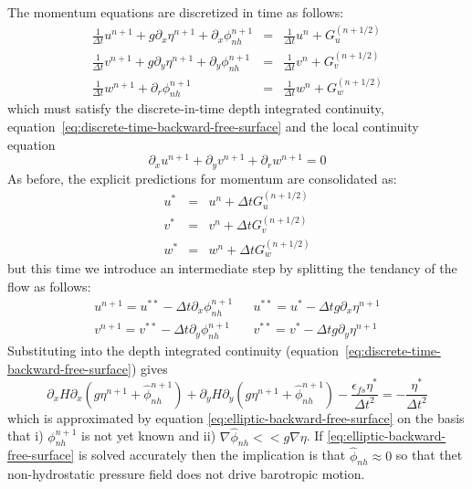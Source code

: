 The momentum equations are discretized in time as follows:
\begin{eqnarray}
\frac{1}{\Delta t} u^{n+1} + g \partial_x \eta^{n+1} + \partial_x \phi_{nh}^{n+1}
& = & \frac{1}{\Delta t} u^{n} + G_u^{(n+1/2)} \label{eq:discrete-time-u-nh} \\
\frac{1}{\Delta t} v^{n+1} + g \partial_y \eta^{n+1} + \partial_y \phi_{nh}^{n+1}
& = & \frac{1}{\Delta t} v^{n} + G_v^{(n+1/2)} \label{eq:discrete-time-v-nh} \\
\frac{1}{\Delta t} w^{n+1} + \partial_r \phi_{nh}^{n+1}
& = & \frac{1}{\Delta t} w^{n} + G_w^{(n+1/2)} \label{eq:discrete-time-w-nh}
\end{eqnarray}
which must satisfy the discrete-in-time depth integrated continuity,
equation~\ref{eq:discrete-time-backward-free-surface} and the local continuity equation
\begin{equation}
\partial_x u^{n+1} + \partial_y v^{n+1} + \partial_r w^{n+1} = 0
\label{eq:non-divergence-nh}
\end{equation}
As before, the explicit predictions for momentum are consolidated as:
\begin{eqnarray*}
u^* & = & u^n + \Delta t G_u^{(n+1/2)} \\
v^* & = & v^n + \Delta t G_v^{(n+1/2)} \\
w^* & = & w^n + \Delta t G_w^{(n+1/2)}
\end{eqnarray*}
but this time we introduce an intermediate step by splitting the
tendancy of the flow as follows:
\begin{eqnarray}
u^{n+1} = u^{**} - \Delta t \partial_x \phi_{nh}^{n+1}
& &
u^{**} = u^{*} - \Delta t g \partial_x \eta^{n+1} \\
v^{n+1} = v^{**} - \Delta t \partial_y \phi_{nh}^{n+1}
& &
v^{**} = v^{*} - \Delta t g \partial_y \eta^{n+1}
\end{eqnarray}
Substituting into the depth integrated continuity
(equation~\ref{eq:discrete-time-backward-free-surface}) gives
\begin{equation}
\partial_x H \partial_x \left( g \eta^{n+1} + \widehat{\phi}_{nh}^{n+1} \right)
+
\partial_y H \partial_y \left( g \eta^{n+1} + \widehat{\phi}_{nh}^{n+1} \right)
 - \frac{\epsilon_{fs}\eta^*}{\Delta t^2}
= - \frac{\eta^*}{\Delta t^2}
\end{equation}
which is approximated by equation
\ref{eq:elliptic-backward-free-surface} on the basis that i)
$\phi_{nh}^{n+1}$ is not yet known and ii) $\nabla \widehat{\phi}_{nh}
<< g \nabla \eta$. If \ref{eq:elliptic-backward-free-surface} is
solved accurately then the implication is that $\widehat{\phi}_{nh}
\approx 0$ so that thet non-hydrostatic pressure field does not drive
barotropic motion.

